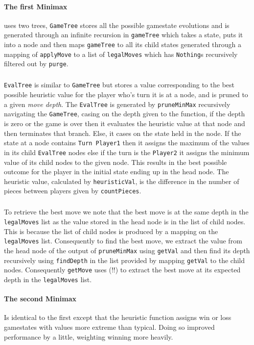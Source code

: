 \documentclass[11pt]{article}
\begin{document}
\paragraph{The first Minimax} uses two trees, \verb|GameTree| stores all the possible gamestate evolutions and is generated through an infinite recursion in \verb|gameTree| which takes a state, puts it into a node and then maps \verb|gameTree| to all its child states generated through a mapping of \verb|applyMove| to a list of \verb|legalMoves| which has \verb|Nothing|s recursively filtered out by \verb|purge|.

\subparagraph*{}\verb|EvalTree| is similar to \verb|GameTree| but stores a value corresponding to the best possible heuristic value for the player who's turn it is at a node, and is pruned to a given \textit{move depth}. The \verb|EvalTree| is generated by \verb|pruneMinMax| recursively navigating the \verb|GameTree|, casing on the depth given to the function, if the depth is zero or the game is over then it evaluates the heuristic value at that node and then terminates that branch. Else, it cases on the state held in the node. If the state at a node contains \verb|Turn Player1| then it assigns the maximum of the values in its child \verb|EvalTree| nodes else if the turn is the \verb|Player2| it assigns the minimum value of its child nodes to the given node. This results in the best possible outcome for the player in the initial state ending up in the head node. The heuristic value, calculated by \verb|heuristicVal|, is the difference in the number of pieces between players given by \verb|countPieces|.

\subparagraph*{}To retrieve the best move we note that the best move is at the same depth in the \verb|legalMoves| list as the value stored in the head node is in the list of child nodes. This is because the list of child nodes is produced by a mapping on the \verb|legalMoves| list. Consequently to find the best move, we extract the value from the head node of the output of \verb|pruneMinMax| using \verb|getVal| and then find its depth recursively using \verb|findDepth| in the list provided by mapping \verb|getVal| to the child nodes. Consequently \verb|getMove| uses (!!) to extract the best move at its expected depth in the \verb|legalMoves| list.

\paragraph*{The second Minimax} Is identical to the first except that the heuristic function assigns win or loss gamestates with values more extreme than typical. Doing so improved performance by a little, weighting winning more heavily.
\end{document}

